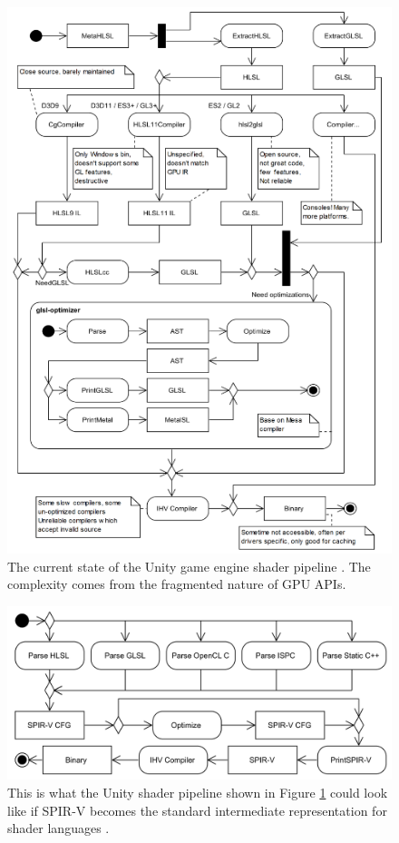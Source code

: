 \documentclass[a4paper,12pt,twoside,openright]{report}
\begin{document}
\begin{figure}[h]
\centering
\includegraphics[width=0.8\linewidth]{unity_shader_madness}
\caption{The current state of the Unity game engine shader pipeline
\cite{UnityShaderPipeline}. The complexity comes from the fragmented nature
of GPU APIs.}
\label{fig:unity_shader_madness}
\end{figure}

\begin{figure}[h]
\centering
\includegraphics[width=0.8\linewidth]{unity_shader_sanity}
\caption{This is what the Unity shader pipeline shown in Figure
\ref{fig:unity_shader_madness} could look like if SPIR-V becomes the standard
intermediate representation for shader languages \cite{UnityShaderPipeline}.}
\label{fig:unity_shader_sanity}
\end{figure}
\end{document}
